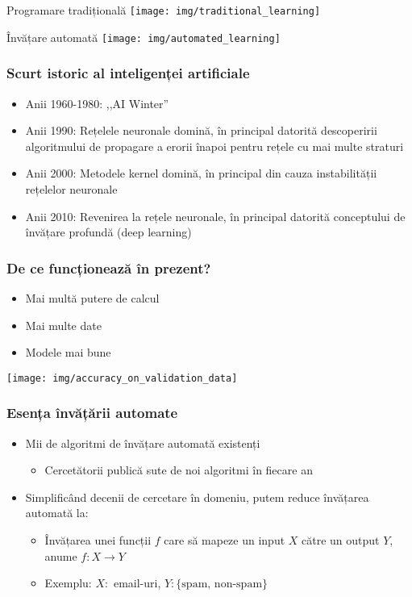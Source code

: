 \documentclass{beamer}
\newcommand*{\utb}{\item[{\texttt{[image: img/UTSymbols-Bullet.png]}}]}
\begin{document}
\begin{frame}
    \begin{center}
        \huge Programare tradițională
        \texttt{[image: img/traditional\_learning]}
    \end{center}
    \begin{center}
        \huge Învățare automată
        \texttt{[image: img/automated\_learning]}
    \end{center}
\end{frame}

\begin{frame}
    \frametitle{Scurt istoric al inteligenței artificiale}
    \begin{itemize}
        \utb Anii 1960-1980: ,,AI Winter''
        \utb Anii 1990: Rețelele neuronale domină, în principal datorită descoperirii algoritmului de propagare a erorii înapoi pentru rețele cu mai multe straturi
        \utb Anii 2000: Metodele kernel domină, în principal din cauza instabilității rețelelor neuronale
        \utb Anii 2010: Revenirea la rețele neuronale, în principal datorită conceptului de învățare profundă (deep learning)
    \end{itemize}
\end{frame}

\begin{frame}
    \frametitle{De ce funcționează în prezent?}
    \begin{minipage}[t!]{0.45\textwidth}
        \begin{itemize}
            \utb Mai multă putere de calcul
            \utb Mai multe date
            \utb Modele mai bune
        \end{itemize}
    \end{minipage}
    \begin{minipage}[t!]{0.54\textwidth}
        \texttt{[image: img/accuracy\_on\_validation\_data]}
    \end{minipage}
\end{frame}

\begin{frame}
    \frametitle{Esența învățării automate}
    \begin{itemize}
        \utb Mii de algoritmi de învățare automată existenți
        \begin{itemize}
            \utb Cercetătorii publică sute de noi algoritmi în fiecare an
        \end{itemize}
        \utb Simplificând decenii de cercetare în domeniu, putem
        reduce învățarea automată la:
        \begin{itemize}
            \utb Învățarea unei funcții $f$ care să mapeze un input $X$ către un output $Y$, anume $f:X \rightarrow Y$
            \utb Exemplu: $X:$ email-uri, $Y:\{\text{spam, non-spam}\}$
        \end{itemize}
    \end{itemize}
\end{frame}
\end{document}
